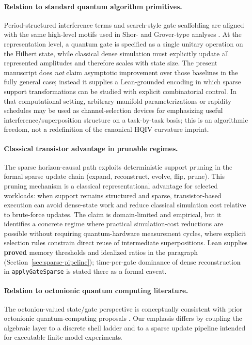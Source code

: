 \documentclass[11pt,a4paper]{article}
\newcommand{\lean}[1]{\path{#1}}
\theoremstyle{remark}
\begin{document}
\paragraph{Relation to standard quantum algorithm primitives.}
Period-structured interference terms and search-style gate scaffolding are aligned with the same high-level motifs used in Shor- and Grover-type analyses \cite{shor1997,grover1996}. At the representation level, a quantum gate is specified as a single unitary operation on the Hilbert state, while classical dense simulation must explicitly update all represented amplitudes and therefore scales with state size. The present manuscript does \emph{not} claim asymptotic improvement over those baselines in the fully general case; instead it supplies a Lean-grounded encoding in which sparse support transformations can be studied with explicit combinatorial control. In that computational setting, arbitrary manifold parameterizations or rapidity schedules may be used as channel-selection devices for emphasizing useful interference/superposition structure on a task-by-task basis; this is an algorithmic freedom, not a redefinition of the canonical HQIV curvature imprint.

\paragraph{Classical transistor advantage in prunable regimes.}
The sparse horizon-causal path exploits deterministic support pruning in the formal sparse update chain (expand, reconstruct, evolve, flip, prune). This pruning mechanism is a classical representational advantage for selected workloads: when support remains structured and sparse, transistor-based execution can avoid dense-state work and reduce classical simulation cost relative to brute-force updates. The claim is domain-limited and empirical, but it identifies a concrete regime where practical simulation-cost reductions are possible without requiring quantum-hardware measurement cycles, where explicit selection rules constrain direct reuse of intermediate superpositions.
Lean supplies \textbf{proved} memory thresholds and idealized ratios in the \lean{SparseSimulationDensityCrossover} paragraph (Section~\ref{sec:sparse-pipeline}); time-per-gate dominance of dense reconstruction in \texttt{applyGateSparse} is stated there as a formal caveat.

\paragraph{Relation to octonionic quantum computing literature.}
The octonion-valued state/gate perspective is conceptually consistent with prior octonionic quantum-computing proposals \cite{freedman2019,baez2002octonions,dixon2020octonionic}. Our emphasis differs by coupling the algebraic layer to a discrete shell ladder and to a sparse update pipeline intended for executable finite-model experiments.
\end{document}
